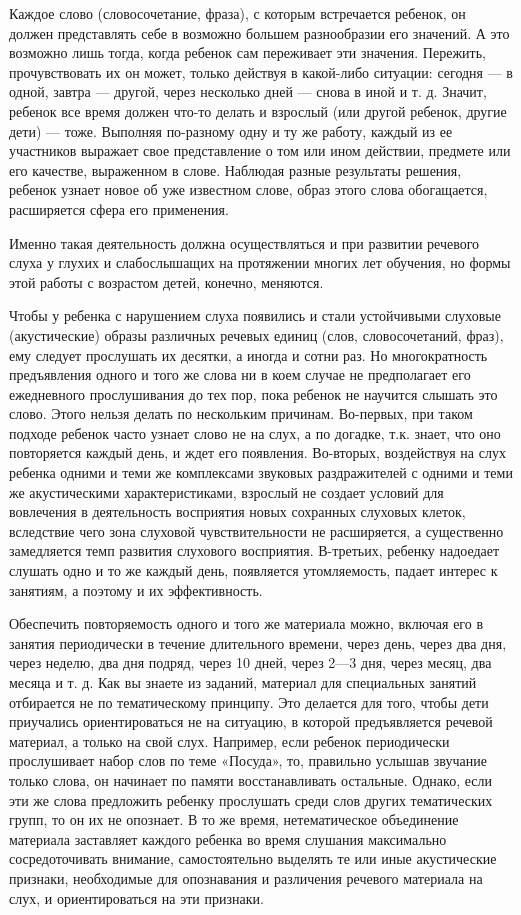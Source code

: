 \documentclass[a5paper]{book}
\begin{document}
Каждое слово (словосочетание, фраза), с которым встречается ребенок, он
должен представлять себе в возможно большем разнообразии его значений. А
это возможно лишь тогда, когда ребенок сам переживает эти значения.
Пережить, прочувствовать их он может, только действуя в какой-либо
ситуации: сегодня --- в одной, завтра --- другой, через несколько дней
--- снова в иной и т. д. Значит, ребенок все время должен что-то делать
и взрослый (или другой ребенок, другие дети) --- тоже. Выполняя
по-разному одну и ту же работу, каждый из ее участников выражает свое
представление о том или ином действии, предмете или его качестве,
выраженном в слове. Наблюдая разные результаты решения, ребенок узнает
новое об уже известном слове, образ этого слова обогащается, расширяется
сфера его применения.

Именно такая деятельность должна осуществляться и при развитии речевого
слуха у глухих и слабослышащих на протяжении многих лет обучения, но
формы этой работы с возрастом детей, конечно, меняются.

Чтобы у ребенка с нарушением слуха появились и стали устойчивыми
слуховые (акустические) образы различных речевых единиц (слов,
словосочетаний, фраз), ему следует прослушать их десятки, а иногда и
сотни раз. Но многократность предъявления одного и того же слова ни в
коем случае не предполагает его ежедневного прослушивания до тех пор,
пока ребенок не научится слышать это слово. Этого нельзя делать по
нескольким причинам. Во-первых, при таком подходе ребенок часто узнает
слово не на слух, а по догадке, т.к. знает, что оно повторяется каждый
день, и ждет его появления. Во-вторых, воздействуя на слух ребенка
одними и теми же комплексами звуковых раздражителей с одними и теми же
акустическими характеристиками, взрослый не создает условий для
вовлечения в деятельность восприятия новых сохранных слуховых клеток,
вследствие чего зона слуховой чувствительности не расширяется, а
существенно замедляется темп развития слухового восприятия. В-третьих,
ребенку надоедает слушать одно и то же каждый день, появляется
утомляемость, падает интерес к занятиям, а поэтому и их эффективность.

Обеспечить повторяемость одного и того же материала можно, включая его в
занятия периодически в течение длительного времени, через день, через
два дня, через неделю, два дня подряд, через 10 дней, через 2---3 дня,
через месяц, два месяца и т. д. Как вы знаете из заданий, материал для
специальных занятий отбирается не по тематическому принципу. Это
делается для того, чтобы дети приучались ориентироваться не на ситуацию,
в которой предъявляется речевой материал, а только на свой слух.
Например, если ребенок периодически прослушивает набор слов по теме
«Посуда», то, правильно услышав звучание только слова, он начинает по
памяти восстанавливать остальные. Однако, если эти же слова предложить
ребенку прослушать среди слов других тематических групп, то он их не
опознает. В то же время, нетематическое объединение материала заставляет
каждого ребенка во время слушания максимально сосредоточивать внимание,
самостоятельно выделять те или иные акустические признаки, необходимые
для опознавания и различения речевого материала на слух, и
ориентироваться на эти признаки.
\end{document}
